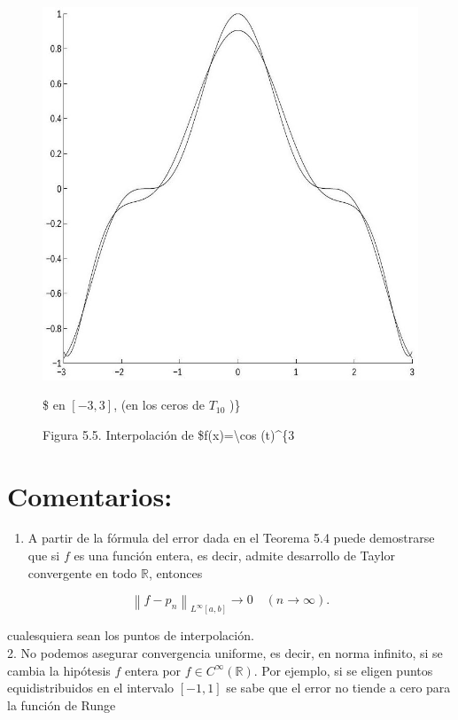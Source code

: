 \documentclass[10pt]{article}
\begin{document}
\begin{figure}[h]
\begin{center}
  \includegraphics[width=\textwidth]{2025_09_05_3888c9ac96bd653d96b4g-107}
\captionsetup{labelformat=empty}
\caption{Figura 5.5. Interpolación de \$f(x)=\textbackslash cos (t)\^{}\{3}\$ en $[-3,3]$, (en los ceros de $T_{10}$ )\}\end{center}
\end{figure}

\section*{Comentarios:}
\begin{enumerate}
  \item A partir de la fórmula del error dada en el Teorema 5.4 puede demostrarse que si $f$ es una función entera, es decir, admite desarrollo de Taylor convergente en todo $\mathbb{R}$, entonces
\end{enumerate}

$$
\left\|f-p_{n}\right\|_{L^{\infty}[a, b]} \rightarrow 0 \quad(n \rightarrow \infty) .
$$

cualesquiera sean los puntos de interpolación.\\
2. No podemos asegurar convergencia uniforme, es decir, en norma infinito, si se cambia la hipótesis $f$ entera por $f \in C^{\infty}(\mathbb{R})$. Por ejemplo, si se eligen puntos equidistribuidos en el intervalo $[-1,1]$ se sabe que el error no tiende a cero para la función de Runge
\end{document}
